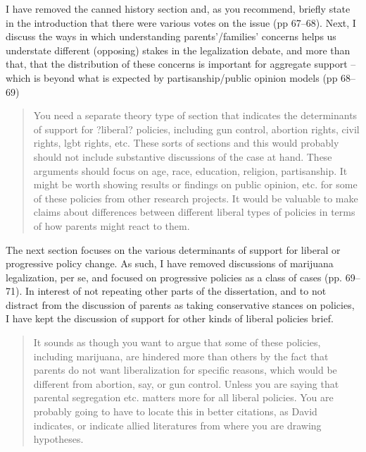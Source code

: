 \documentclass[12pt,stdletter,dateno,sigleft]{newlfm} %
\begin{document}
\begin{newlfm}
I have removed the canned history section and, as you recommend, briefly state in the introduction that there were various votes on the issue (pp 67--68). Next, I discuss the ways in which understanding parents'/families' concerns helps us understate different (opposing) stakes in the legalization debate, and more than that, that the distribution of these concerns is important for aggregate support -- which is beyond what is expected by partisanship/public opinion models (pp 68--69)


\begin{quotation}{\color{red}\noindent \footnotesize
You need a separate theory type of section that indicates the determinants of support for ?liberal? policies, including gun control, abortion rights, civil rights, lgbt rights, etc.  These sorts of sections and this would probably should not include substantive discussions of the case at hand. These arguments should focus on age, race, education, religion, partisanship.  It might be worth showing results or findings on public opinion, etc. for some of these policies from other research projects.  It would be valuable to make claims about differences between different liberal types of policies in terms of how parents might react to them. 
}
\end{quotation}



The next section focuses on the various determinants of support for liberal or progressive policy change. As such, I have removed discussions of marijuana legalization, per se, and focused on progressive policies as a class of cases (pp. 69--71). In interest of not repeating other parts of the dissertation, and to not distract from the discussion of parents as taking conservative stances on policies, I have kept the discussion of support for other kinds of liberal policies brief. 


\begin{quotation}{\color{red}\noindent \footnotesize
It sounds as though you want to argue that some of these policies, including marijuana, are hindered more than others by the fact that parents do not want liberalization for specific reasons, which would be different from abortion, say, or gun control. Unless you are saying that parental segregation etc. matters more for all liberal policies. You are probably going to have to locate this in better citations, as David indicates, or indicate allied literatures from where you are drawing hypotheses.
}
\end{quotation}


\end{newlfm}
\end{document}
